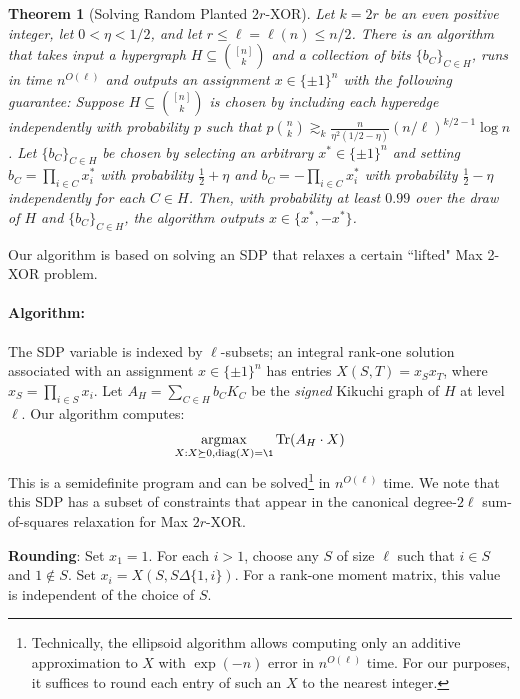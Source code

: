 \documentclass
[11pt,letterpaper]
{article}
\DeclareMathOperator*{\argmax}{\arg\!\max}
\providecommand*{\Tr}{\mathop{\mathrm{Tr}}}
\providecommand*{\diag}{\mathop{\mathrm{diag}}}
\newtheorem{theorem}{Theorem}[section]
\begin{document}
\begin{theorem}[Solving Random Planted $2r$-XOR] \label{thm:main-planted-xor-even}
Let $k=2r$ be an even positive integer, let $0<\eta<1/2$, and let $r\leq \ell = \ell(n) \leq n/2$. There is an algorithm that takes input a hypergraph $H \subseteq {[n] \choose k}$ and a collection of bits $\{b_C\}_{C \in H}$, runs in time $n^{O(\ell)}$ and outputs an assignment $x\in \{\pm 1\}^n$ with the following guarantee:
Suppose $H \subseteq {[n] \choose k}$ is chosen by including each hyperedge independently with probability $p$ such that $p {n \choose k} \gtrsim_k \frac{n}{\eta^2(1/2-\eta)} (n/\ell)^{k/2-1} \log n$. Let $\{b_C\}_{C \in H}$ be chosen by selecting an arbitrary $x^* \in \{\pm 1\}^n$ and setting $b_C = \prod_{i \in C} x^*_i$ with probability $\frac{1}{2} + \eta$ and  $b_C = -\prod_{i \in C} x^*_i$ with probability $\frac{1}{2} -\eta$ independently for each $C \in H$. Then, with probability at least $0.99$ over the draw of $H$ and $\{ b_C \}_{C \in H}$, the algorithm outputs $x \in \{x^*,-x^*\}$. 
\end{theorem}

Our algorithm is based on solving an SDP that relaxes a certain ``lifted" Max 2-XOR problem. 



\paragraph{Algorithm:} 
The SDP variable is indexed by $\ell$-subsets; an integral rank-one solution associated with an assignment $x\in\{\pm 1\}^n$ has entries $X(S,T)=x_Sx_T$, where $x_S=\prod_{i\in S}x_i$.
Let $A_H = \sum_{C \in H} b_C K_C$ be the \emph{signed} Kikuchi graph of $H$ at level $\ell$. Our algorithm computes:
\begin{equation} \label{eq:sdp-even}
    \argmax_{X: X \succeq 0, \diag(X) = \1} \Tr(A_H \cdot X)
\end{equation} This is a semidefinite program and can be solved\footnote{Technically, the ellipsoid algorithm allows computing only an additive approximation to $X$ with $\exp(-n)$ error in $n^{O(\ell)}$ time. For our purposes, it suffices to round each entry of such an $X$ to the nearest integer.} in $n^{O(\ell)}$ time. We note that this SDP has a subset of constraints that appear in the canonical degree-$2\ell$ sum-of-squares relaxation for Max $2r$-XOR.

\textbf{Rounding}: Set $x_1 = 1$. For each $i>1$, choose any $S$ of size $\ell$ such that $i \in S$ and $1 \not \in S$. Set  $x_i = X(S,S \Delta \{1,i\})$.
For a rank-one moment matrix, this value is independent of the choice of $S$.
\end{document}
